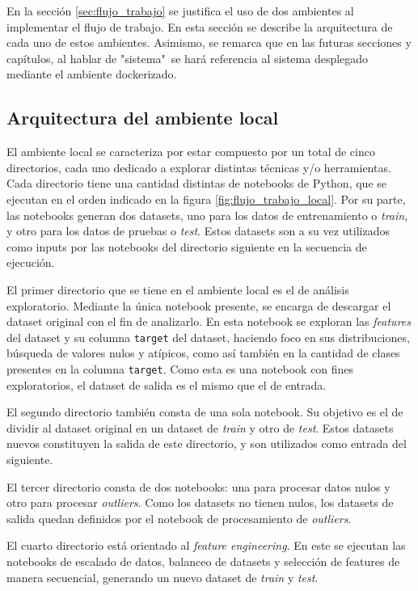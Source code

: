 En la sección \ref{sec:flujo_trabajo} se justifica el uso de dos ambientes al implementar el flujo de trabajo. En esta sección se describe la arquitectura de cada uno de estos ambientes. Asimismo, se remarca que en las futuras secciones y capítulos, al hablar de "sistema"\ se hará referencia al sistema desplegado mediante el ambiente dockerizado.

\subsection{Arquitectura del ambiente local}

El ambiente local se caracteriza por estar compuesto por un total de cinco directorios, cada uno dedicado a explorar distintas técnicas y/o herramientas. Cada directorio tiene una cantidad distintas de notebooks de Python, que se ejecutan en el orden indicado en la figura \ref{fig:flujo_trabajo_local}. Por su parte, las notebooks generan dos datasets, uno para los datos de entrenamiento o \textit{train}, y otro para los datos de pruebas o \textit{test}. Estos datasets son a su vez utilizados como inputs por las notebooks del directorio siguiente en la secuencia de ejecución.

El primer directorio que se tiene en el ambiente local es el de análisis exploratorio. Mediante la única notebook presente, se encarga de descargar el dataset original con el fin de analizarlo. En esta notebook se exploran las \textit{features} del dataset y su columna \texttt{target} del dataset, haciendo foco en sus distribuciones, búsqueda de valores nulos y atípicos, como así también en la cantidad de clases presentes en la columna \texttt{target}. Como esta es una notebook con fines exploratorios, el dataset de salida es el mismo que el de entrada.

El segundo directorio también consta de una sola notebook. Su objetivo es el de dividir al dataset original en un dataset de \textit{train} y otro de \textit{test}. Estos datasets nuevos constituyen la salida de este directorio, y son utilizados como entrada del siguiente.

El tercer directorio consta de dos notebooks: una para procesar datos nulos y otro para procesar \textit{outliers}. Como los datasets no tienen nulos, los datasets de salida quedan definidos por el notebook de procesamiento de \textit{outliers}.

El cuarto directorio está orientado al \textit{feature engineering}. En este se ejecutan las notebooks de escalado de datos, balanceo de datasets y selección de features de manera secuencial, generando un nuevo dataset de \textit{train} y \textit{test}.

